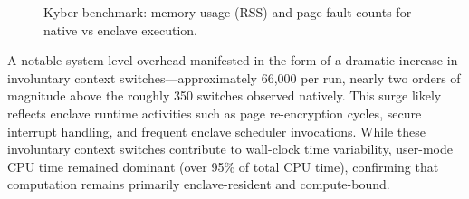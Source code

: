 \begin{figure}[h]
\centering
{}
\caption{Kyber benchmark: memory usage (RSS) and page fault counts for native vs enclave execution.}
\label{fig:memory_pagefaults_chart}
\end{figure}



A notable system-level overhead manifested in the form of a dramatic increase in involuntary context switches—approximately 66,000 per run, nearly two orders of magnitude above the roughly 350 switches observed natively. This surge likely reflects enclave runtime activities such as page re-encryption cycles, secure interrupt handling, and frequent enclave scheduler invocations. While these involuntary context switches contribute to wall-clock time variability, user-mode CPU time remained dominant (over 95\% of total CPU time), confirming that computation remains primarily enclave-resident and compute-bound.

